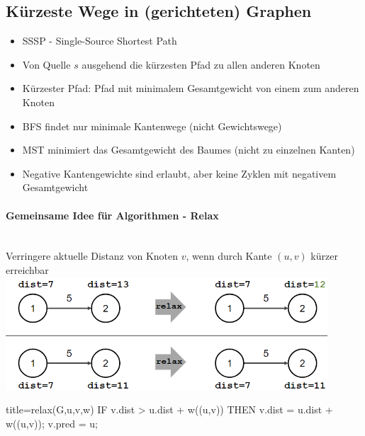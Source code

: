 \documentclass[
    ngerman,
    color=3b,
    dark_mode,
    load_common, %
    summary,
    boxarc,
]{tuda_summary}
\begin{document}
\subsection{Kürzeste Wege in (gerichteten) Graphen}
\begin{definition}[SSSP]\mbox{}
    \begin{itemize}
        \item SSSP - Single-Source Shortest Path
        \item Von Quelle $s$ ausgehend die kürzesten Pfad zu allen anderen Knoten
        \item Kürzester Pfad: Pfad mit minimalem Gesamtgewicht von einem zum anderen Knoten
        \item BFS findet nur minimale Kantenwege (nicht Gewichtswege)
        \item MST minimiert das Gesamtgewicht des Baumes (nicht zu einzelnen Kanten)
        \item Negative Kantengewichte sind erlaubt, aber keine Zyklen mit negativem Gesamtgewicht
    \end{itemize}
\end{definition}
\vspace{-1em}
\paragraph{Gemeinsame Idee für Algorithmen - Relax}\mbox{}\\
Verringere aktuelle Distanz von Knoten $v$, wenn durch Kante $(u,v)$ kürzer erreichbar\\
\includegraphics[width=12cm]{pictures/ssspRelax.PNG}
\begin{codeBlock}[autogobble]{title={relax(G,u,v,w)}}
IF v.dist > u.dist + w((u,v)) THEN
    v.dist = u.dist + w((u,v));
    v.pred = u;
\end{codeBlock}
\clearpage
\end{document}

